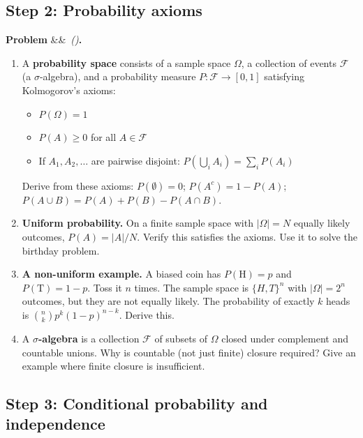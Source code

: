 \documentclass[12pt, a4paper]{article}
\newcounter{problem}
\newenvironment{problem}[1][]{%
  \refstepcounter{problem}%
  \par\vspace{6pt}%
  \noindent\textbf{\color{MidBlue}Problem \theproblem}%
  \ifx&#1&\else\ \textit{(#1)}\fi\textbf{.}\enskip
}{\par\vspace{4pt}}
\begin{document}
\subsection{Step 2: Probability axioms}

\begin{problem}
\label{prob:axioms}
\begin{enumerate}[label=(\alph*),topsep=2pt]
  \item A \textbf{probability space} consists of a sample space $\Omega$, a collection of events $\mathcal{F}$ (a $\sigma$-algebra), and a probability measure $P:\mathcal{F}\to[0,1]$ satisfying Kolmogorov's axioms:
  \begin{itemize}[noitemsep]
    \item $P(\Omega)=1$
    \item $P(A)\geq 0$ for all $A\in\mathcal{F}$
    \item If $A_1,A_2,\ldots$ are pairwise disjoint: $P\!\left(\bigcup_i A_i\right)=\sum_i P(A_i)$
  \end{itemize}
  Derive from these axioms: $P(\emptyset)=0$; $P(A^c)=1-P(A)$; $P(A\cup B)=P(A)+P(B)-P(A\cap B)$.
  \item \textbf{Uniform probability.} On a finite sample space with $|\Omega|=N$ equally likely outcomes, $P(A) = |A|/N$. Verify this satisfies the axioms. Use it to solve the birthday problem.
  \item \textbf{A non-uniform example.} A biased coin has $P(\text{H})=p$ and $P(\text{T})=1-p$. Toss it $n$ times. The sample space is $\{H,T\}^n$ with $|\Omega|=2^n$ outcomes, but they are not equally likely. The probability of exactly $k$ heads is $\binom{n}{k}p^k(1-p)^{n-k}$. Derive this.
  \item A \textbf{$\sigma$-algebra} is a collection $\mathcal{F}$ of subsets of $\Omega$ closed under complement and countable unions. Why is countable (not just finite) closure required? Give an example where finite closure is insufficient.
\end{enumerate}
\end{problem}

\subsection{Step 3: Conditional probability and independence}
\end{document}
